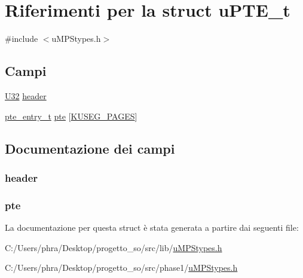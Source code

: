 \hypertarget{structu_p_t_e__t}{\section{Riferimenti per la struct u\-P\-T\-E\-\_\-t}
\label{structu_p_t_e__t}
}


{\ttfamily \#include $<$u\-M\-P\-Stypes.\-h$>$}

\subsection*{Campi}
\begin{DoxyCompactItemize}
\item 
\hyperlink{lib_2base_8h_ac3df7cf3c8cb172a588adec881447d68}{U32} \hyperlink{structu_p_t_e__t_a45eed61436d7fec550ec1071e528d577}{header}
\item 
\hyperlink{structpte__entry__t}{pte\-\_\-entry\-\_\-t} \hyperlink{structu_p_t_e__t_a204ccbbb972125396c1c5d89cede3d4d}{pte} \mbox{[}\hyperlink{phase1_2const_8h_a343972254f8fab5a6141ba018d1ed7a2}{K\-U\-S\-E\-G\-\_\-\-P\-A\-G\-E\-S}\mbox{]}
\end{DoxyCompactItemize}


\subsection{Documentazione dei campi}
\hypertarget{structu_p_t_e__t_a45eed61436d7fec550ec1071e528d577}{
\subsubsection[{header}]{ header}}\label{structu_p_t_e__t_a45eed61436d7fec550ec1071e528d577}
\hypertarget{structu_p_t_e__t_a204ccbbb972125396c1c5d89cede3d4d}{
\subsubsection[{pte}]{ pte}}\label{structu_p_t_e__t_a204ccbbb972125396c1c5d89cede3d4d}


La documentazione per questa struct è stata generata a partire dai seguenti file\-:\begin{DoxyCompactItemize}
\item 
C\-:/\-Users/phra/\-Desktop/progetto\-\_\-so/src/lib/\hyperlink{lib_2u_m_p_stypes_8h}{u\-M\-P\-Stypes.\-h}\item 
C\-:/\-Users/phra/\-Desktop/progetto\-\_\-so/src/phase1/\hyperlink{phase1_2u_m_p_stypes_8h}{u\-M\-P\-Stypes.\-h}\end{DoxyCompactItemize}
